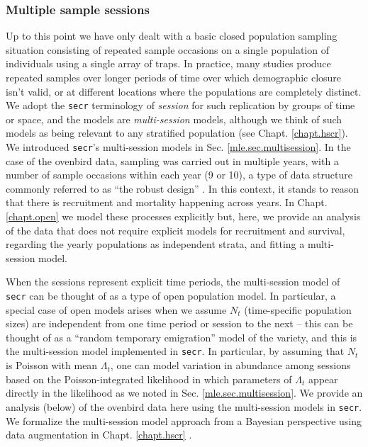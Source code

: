 \subsubsection{Multiple sample sessions}

Up to this point we have only dealt with a basic closed population
sampling situation consisting of repeated sample occasions on a single
population of individuals using a single array of traps. In practice,
many studies produce repeated samples over longer periods of time over
which demographic closure isn't valid, or at different locations where
the populations are completely distinct. We adopt the \mbox{\tt secr}
terminology of {\it session} for such replication by groups of time or
space, and the models are {\it multi-session} models, although we
think of such models as being relevant to any stratified population
(see Chapt. \ref{chapt.hscr}).  We introduced \mbox{\tt secr}'s
multi-session models in Sec. \ref{mle.sec.multisession}.  In the case
of the ovenbird data, sampling was carried out in multiple years, with
a number of sample occasions within each year (9 or 10), a type of
data structure commonly referred to as ``the robust design''
\citep{pollock:1982}.  In this context, it stands to reason that there
is recruitment and mortality happening across years. In
Chapt. \ref{chapt.open} we model these processes explicitly but, here,
we provide an analysis of the data that does not require explicit
models for recruitment and survival, regarding the yearly populations
as independent strata, and fitting a multi-session model.

When the sessions represent explicit time periods, the multi-session
model of \mbox{\tt secr} can be thought of as a type of open
population model.  In particular, a special case of open models arises
when we assume $N_{t}$ (time-specific population sizes) are
independent from one time period or session to the next -- this can be
thought of as a ``random temporary emigration'' model of the
\citet{kendall_etal:1997} variety, and this is the multi-session model
implemented in \mbox{\tt secr}.  In particular, by assuming that
$N_{t}$ is Poisson with mean $\Lambda_{t}$, one can model variation in
abundance among sessions based on the Poisson-integrated likelihood in
which parameters of $\Lambda_{t}$ appear directly in the likelihood as
we noted in Sec. \ref{mle.sec.multisession}.  We provide an analysis
(below) of the ovenbird data here using the multi-session models in
\mbox{\tt secr}.  We formalize the multi-session model approach from a
Bayesian perspective using data augmentation in
Chapt. \ref{chapt.hscr}
\citep{converse_royle:2012,royle_converse:2013}.

